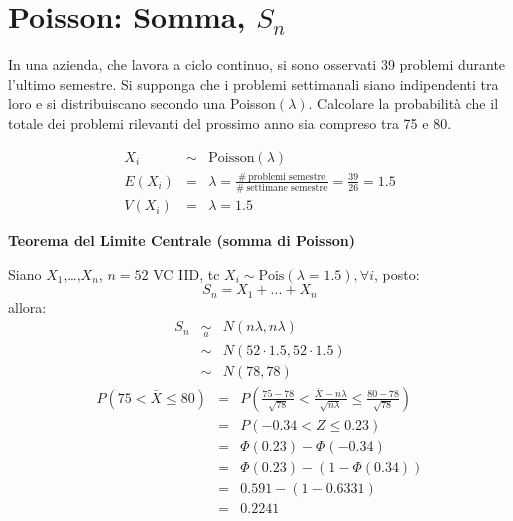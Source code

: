 \documentclass[
  11pt,
]{book}
\theoremstyle{mytheoremstyle}
\theoremstyle{mydefstyle}
\newenvironment{sol}
  {
  \begin{tcolorbox}[enhanced,breakable,arc=0.1mm,boxrule=1pt,colback=white,colframe=iblue,
  title=\bf \fontfamily{lmss}\selectfont \hspace{.5 cm} Soluzione,drop fuzzy shadow]

}{
\end{tcolorbox}
  }
\begin{document}
\section{\texorpdfstring{Poisson: Somma, \(S_{n}\)}{Poisson: Somma, S\_\{n\}}}\label{poisson-somma-s_n}

In una azienda, che lavora a ciclo continuo, si sono osservati 39
problemi durante l'ultimo semestre. Si supponga che i problemi
settimanali siano indipendenti tra loro e si distribuiscano secondo una
Poisson\((\lambda)\). Calcolare la probabilità che il totale dei problemi
rilevanti del prossimo anno sia compreso tra 75 e 80.

\begin{sol}
\begin{eqnarray*}
X_{i}    &\sim& \mbox{Poisson}(\lambda)                            \\
E(X_{i})    &=& \lambda = \frac{\#\ \mbox{problemi semestre}}
                {\#\ \mbox{settimane semestre}}
             =  \frac{39} {26} = 1.5                               \\
V(X_{i})    &=& \lambda = 1.5                                      
\end{eqnarray*}

\textbf{Teorema del Limite Centrale (somma di Poisson)}

Siano \(X_1\),\ldots,\(X_n\), \(n=52\) VC IID, tc \(X_i\sim\text{Pois}(\lambda=1.5)\)\(,\forall i\), posto:
\[
      S_n = X_1 + ... + X_n
      \]
allora:\begin{eqnarray*}
  S_n & \mathop{\sim}\limits_{a}& N(n\lambda,n\lambda) \\
  &\sim & N(52\cdot1.5,52\cdot1.5) \\
     &\sim & N(78,78) 
  \end{eqnarray*}\begin{eqnarray*}
   P( 75 < \bar X \leq  80 ) &=& P\left( \frac { 75  -  78 }{\sqrt{ 78 }} < \frac { \bar X  -  n\lambda }{ \sqrt{n\lambda} } \leq \frac { 80  -  78 }{\sqrt{ 78 }}\right)  \\
              &=& P\left(  -0.34  < Z \leq  0.23 \right) \\
              &=& \Phi( 0.23 )-\Phi( -0.34 )\\
              &=&  \Phi( 0.23 )-(1-\Phi( 0.34 )) \\ &=&  0.591 -(1- 0.6331 ) \\ 
              &=&  0.2241 
   \end{eqnarray*}

\end{sol}
\end{document}
